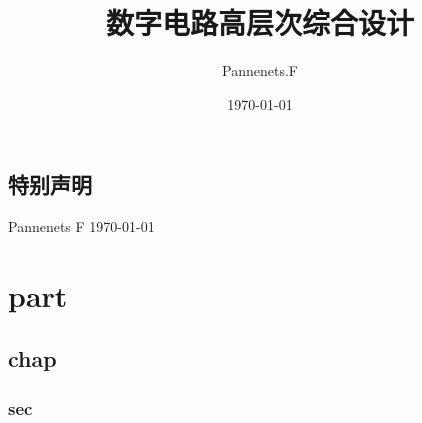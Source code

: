 \documentclass[cn,11pt,chinese,black,simple]{elegantbook}
\title{数字电路高层次综合设计}
\author{Pannenets.F}
\date{\today}
\begin{document}
\maketitle
\frontmatter

\chapter*{特别声明}

\vskip 1.5cm


\begin{flushright}
Pannenets F
\today
\end{flushright}

\tableofcontents

\mainmatter

\part{part}

\chapter{chap}

\section{sec}
\end{document}
